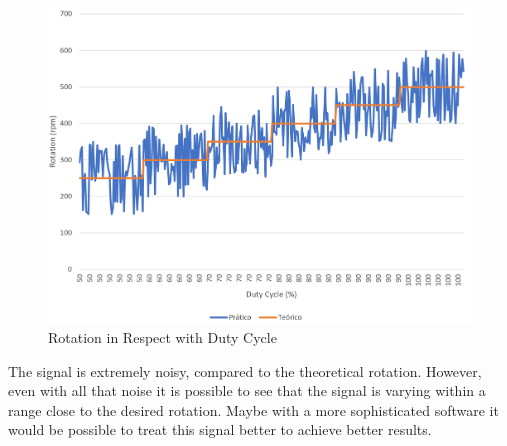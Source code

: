 		\begin{figure}[htbp]
				\centering
				\includegraphics[width=1\textwidth]{figuras/fig-test-analog-rotation}
				\caption{Rotation in Respect with Duty Cycle}
				\label{fig:test-analog-rotation}
		\end{figure}

		The signal is extremely noisy, compared to the theoretical rotation. However, even with all that noise it is possible to see that the signal is varying within a range close to the desired rotation. Maybe with a more sophisticated software it would be possible to treat this signal better to achieve better results.